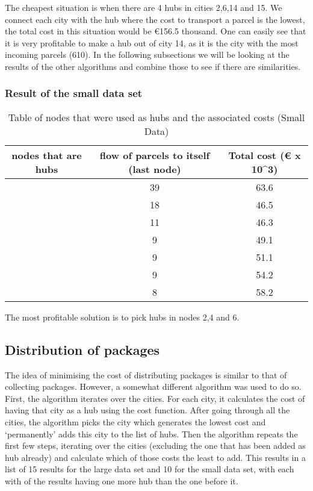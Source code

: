\documentclass{article}
\begin{document}
The cheapest situation is when there are 4 hubs in cities 2,6,14 and 15. We connect each city with the hub where the cost to transport a parcel is the lowest, the total cost in this situation would be €156.5 thousand. One can easily see that it is very profitable to make a hub out of city 14, as it is the city with the most incoming parcels (610). In the following subsections we will be looking at the results of the other algorithms and combine those to see if there are similarities.
\subsubsection{Result of the small data set}

        \begin{table}[h!]
            \begin{tabular}{||c|c|c||}
                \hline
                nodes that are hubs & flow of parcels to itself (last node) & Total cost (€ x 10^3)\\
                \hline
                [2] &  39 & 63.6\\
                \hline
                [2,6]   & 18 & 46.5 \\
                \hline
                [2,6,4] & 11 & 46.3 \\
                \hline
                [2,6,4,3]  & 9 & 49.1  \\
                \hline
                [2,6,4,3,7] & 9 & 51.1 \\
                \hline
                [2,6,4,3,7,9] & 9 & 54.2   \\
                \hline
                [2,6,4,3,7,9,5] & 8 & 58.2 \\
                \hline
            \end{tabular}
        \caption{Table of nodes that were used as hubs and the associated costs (Small Data)}
        \end{table}

The most profitable solution is to pick hubs in nodes 2,4 and 6.        
        

\subsection{Distribution of packages}
\label{Distribution}
The idea of minimising the cost of distributing packages is similar to that of collecting packages. However, a somewhat different algorithm was used to do so. First, the algorithm iterates over the cities. For each city, it calculates the cost of having that city as a hub using the cost function. After going through all the cities, the algorithm picks the city which generates the lowest cost and `permanently' adds this city to the list of hubs. Then the algorithm repeats the first few steps, iterating over the cities (excluding the one that has been added as hub already) and calculate which of those costs the least to add. This results in a list of 15 results for the large data set and 10 for the small data set, with each with of the results having one more hub than the one before it. 
\end{document}
